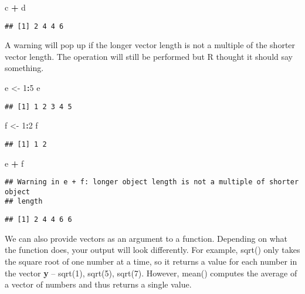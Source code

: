 \documentclass[]{article}
\newenvironment{Shaded}{\begin{snugshade}}{\end{snugshade}}
\newcommand{\DecValTok}[1]{\textcolor[rgb]{0.00,0.00,0.81}{#1}}
\newcommand{\StringTok}[1]{\textcolor[rgb]{0.31,0.60,0.02}{#1}}
\newcommand{\OperatorTok}[1]{\textcolor[rgb]{0.81,0.36,0.00}{\textbf{#1}}}
\newcommand{\NormalTok}[1]{#1}
\begin{document}
\begin{Shaded}
\begin{Highlighting}[]
\NormalTok{c }\OperatorTok{+}\StringTok{ }\NormalTok{d}
\end{Highlighting}
\end{Shaded}

\begin{verbatim}
## [1] 2 4 4 6
\end{verbatim}

A warning will pop up if the longer vector length is not a multiple of
the shorter vector length. The operation will still be performed but R
thought it should say something.

\begin{Shaded}
\begin{Highlighting}[]
\NormalTok{e <-}\StringTok{ }\DecValTok{1}\OperatorTok{:}\DecValTok{5}
\NormalTok{e}
\end{Highlighting}
\end{Shaded}

\begin{verbatim}
## [1] 1 2 3 4 5
\end{verbatim}

\begin{Shaded}
\begin{Highlighting}[]
\NormalTok{f <-}\StringTok{ }\DecValTok{1}\OperatorTok{:}\DecValTok{2}
\NormalTok{f}
\end{Highlighting}
\end{Shaded}

\begin{verbatim}
## [1] 1 2
\end{verbatim}

\begin{Shaded}
\begin{Highlighting}[]
\NormalTok{e }\OperatorTok{+}\StringTok{ }\NormalTok{f}
\end{Highlighting}
\end{Shaded}

\begin{verbatim}
## Warning in e + f: longer object length is not a multiple of shorter object
## length
\end{verbatim}

\begin{verbatim}
## [1] 2 4 4 6 6
\end{verbatim}

We can also provide vectors as an argument to a function. Depending on
what the function does, your output will look differently. For example,
sqrt() only takes the square root of one number at a time, so it returns
a value for each number in the vector \textbf{y} -- sqrt(1), sqrt(5),
sqrt(7). However, mean() computes the average of a vector of numbers and
thus returns a single value.
\end{document}
